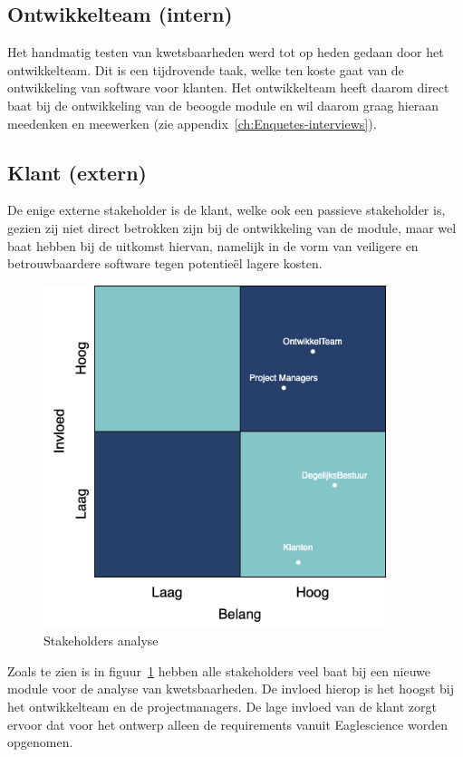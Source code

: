 \subsection{Ontwikkelteam (intern)}\label{subsec:ontwikkelteam-(intern)}
Het handmatig testen van kwetsbaarheden werd tot op heden gedaan door het ontwikkelteam. Dit is een tijdrovende taak, welke ten koste gaat van de ontwikkeling van software voor klanten. Het ontwikkelteam heeft daarom direct baat bij de ontwikkeling van de beoogde module en wil daarom graag hieraan meedenken en meewerken (zie appendix~\ref{ch:Enquetes-interviews}).

\subsection{Klant (extern)}\label{subsec:klant-(extern)}
De enige externe stakeholder is de klant, welke ook een passieve stakeholder is, gezien zij niet direct betrokken zijn bij de ontwikkeling van de module, maar wel baat hebben bij de uitkomst hiervan, namelijk in de vorm van veiligere en betrouwbaardere software tegen potentieël lagere kosten.
\smallskip
\begin{figure}
    \myfloatalign
    \includegraphics[width=10cm]{gfx/stakeholderanalyse}
    \caption{Stakeholders analyse}
    \label{fig:StakeholderAnalyse}
\end{figure}


Zoals te zien is in figuur~\ref{fig:StakeholderAnalyse} hebben alle stakeholders veel baat bij een nieuwe module voor de analyse van kwetsbaarheden. De invloed hierop is het hoogst bij het ontwikkelteam en de projectmanagers. De lage invloed van de klant zorgt ervoor dat voor het ontwerp alleen de requirements vanuit Eaglescience worden opgenomen.

